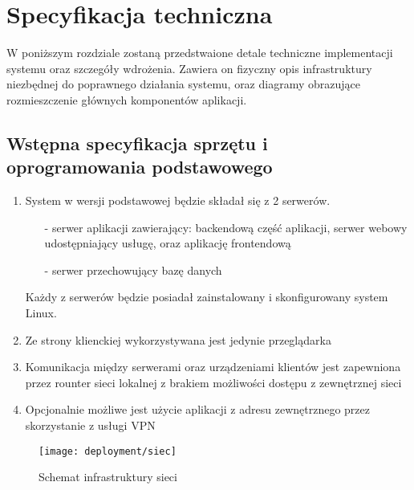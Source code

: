 \section{Specyfikacja techniczna}
W poniższym rozdziale zostaną przedstwaione detale techniczne implementacji systemu oraz szczegóły wdrożenia. Zawiera on fizyczny opis infrastruktury niezbędnej do poprawnego działania systemu, oraz diagramy obrazujące rozmieszczenie głównych komponentów aplikacji.
\subsection{Wstępna specyfikacja sprzętu i oprogramowania podstawowego}
\begin{adjustwidth}{2em}{0pt}

\begin{enumerate}
	\item System w wersji podstawowej będzie składał się z 2 serwerów.
	\begin{itemize}
		\item[-] serwer aplikacji zawierający: backendową część aplikacji, serwer webowy udostępniający usługę, oraz aplikację frontendową
		\item[-] serwer przechowujący bazę danych
	\end{itemize}
Każdy z serwerów będzie posiadał zainstalowany i skonfigurowany system Linux.
	\item Ze strony klienckiej wykorzystywana jest jedynie przeglądarka
	\item Komunikacja między serwerami oraz urządzeniami klientów jest zapewniona przez rounter sieci lokalnej z brakiem możliwości dostępu z zewnętrznej sieci
	\item Opcjonalnie możliwe jest użycie aplikacji z adresu zewnętrznego przez skorzystanie z usługi VPN 
\end{enumerate}

\begin{figure}[H]
    \centering
	\texttt{[image: deployment/siec]}
    \caption{Schemat infrastruktury sieci}
    \label{fig:Deploymentdiagram1}
\end{figure}

\end{adjustwidth}

